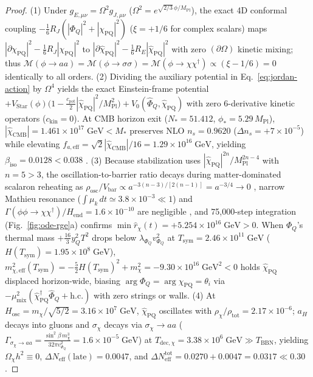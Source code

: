 \documentclass[11pt,a4paper]{article}
\begin{document}
\begin{proof}
(1) Under $g_{E,\mu\nu} = \Omega^2 g_{J,\mu\nu}$ ($\Omega^2 = e^{\sqrt{2/3}\,\phi/M_{\mathrm{Pl}}}$), the exact 4D conformal coupling $-\frac{1}{6}R_J(|\Phi_Q|^2 + |\chi_{\mathrm{PQ}}|^2)$ ($\xi = +1/6$ for complex scalars) maps $|\partial\chi_{\mathrm{PQ}}|^2 - \frac{1}{6}R_J|\chi_{\mathrm{PQ}}|^2$ to $|\partial\hat{\chi}_{\mathrm{PQ}}|^2 - \frac{1}{6}R_E|\hat{\chi}_{\mathrm{PQ}}|^2$ with zero $(\partial\Omega)$ kinetic mixing; thus $\mathcal{M}(\phi \to aa) = \mathcal{M}(\phi \to \sigma\sigma) = \mathcal{M}(\phi \to \chi\chi^\dagger) \propto (\xi - 1/6) = 0$ identically to all orders.
(2) Dividing the auxiliary potential in Eq.~\eqref{eq:jordan-action} by $\Omega^4$ yields the exact Einstein-frame potential $+V_{\mathrm{Star}}(\phi)\big(1 - \frac{c_{\mathrm{pot}}}{2}|\hat{\chi}_{\mathrm{PQ}}|^2/M_{\mathrm{Pl}}^2\big) + V_0(\hat{\Phi}_Q,\hat{\chi}_{\mathrm{PQ}})$ with zero 6-derivative kinetic operators ($c_{\mathrm{kin}} = 0$). At CMB horizon exit ($N_* = 51.412$, $\phi_* = 5.29\,M_{\mathrm{Pl}}$), $|\hat{\chi}_{\mathrm{CMB}}| = 1.461\times 10^{17}\;\mathrm{GeV} < M_*$ preserves NLO $n_s = 0.9620$ ($\Delta n_s = +7\times 10^{-5}$) while elevating $f_{a,\mathrm{eff}} = \sqrt{2}|\hat{\chi}_{\mathrm{CMB}}|/16 = 1.29\times 10^{16}\;\mathrm{GeV}$, yielding $\beta_{\mathrm{iso}} = 0.0128 < 0.038$ \cite{Linde1991Axion,HarigayaIbeKawasakiYanagida2015}.
(3) Because stabilization uses $|\hat{\chi}_{\mathrm{PQ}}|^{2n}/M_{\mathrm{Pl}}^{2n-4}$ with $n = 5 > 3$, the oscillation-to-barrier ratio decays during matter-dominated scalaron reheating as $\rho_{\mathrm{osc}}/V_{\mathrm{bar}} \propto a^{-3(n-3)/[2(n-1)]} = a^{-3/4} \to 0$ \cite{HarigayaIbeKawasakiYanagida2015}, narrow Mathieu resonance ($\int\mu_k\,dt \simeq 3.8\times 10^{-3} \ll 1$) and $\Gamma(\phi\phi\to\chi\chi^\dagger)/H_{\mathrm{end}} = 1.6\times 10^{-10}$ are negligible \cite{KasuyaKawasakiYanagida1997}, and 75,000-step integration (Fig.~\ref{fig:ode-rge}a) confirms $\min \hat{r}_\chi(t) = +5.254\times 10^{16}\;\mathrm{GeV} > 0$. When $\Phi_Q$'s thermal mass $+\frac{16}{3}y_Q^2 T^2$ drops below $\lambda_{\Phi_Q}v_{\Phi_Q}^2$ at $T_{\mathrm{sym}} = 2.46\times 10^{11}\;\mathrm{GeV}$ ($H(T_{\mathrm{sym}}) = 1.95\times 10^8\;\mathrm{GeV}$), $m_{\chi,\mathrm{eff}}^2(T_{\mathrm{sym}}) = -\frac{5}{2}H(T_{\mathrm{sym}})^2 + m_\chi^2 = -9.30\times 10^{16}\;\mathrm{GeV}^2 < 0$ holds $\hat{\chi}_{\mathrm{PQ}}$ displaced horizon-wide, biasing $\arg\Phi_Q = \arg\chi_{\mathrm{PQ}} = \theta_i$ via $-\mu_{\mathrm{mix}}^2(\hat{\chi}_{\mathrm{PQ}}^\dagger\hat{\Phi}_Q + \mathrm{h.c.})$ with zero strings or walls.
(4) At $H_{\mathrm{osc}} = m_\chi/\sqrt{5/2} = 3.16\times 10^7\;\mathrm{GeV}$, $\hat{\chi}_{\mathrm{PQ}}$ oscillates with $\rho_\chi/\rho_{\mathrm{tot}} = 2.17\times 10^{-6}$; $a_H$ decays into gluons and $\sigma_\chi$ decays via $\sigma_\chi \to aa$ ($\Gamma_{\sigma_\chi\to aa} = \frac{\sin^2\beta\,m_\chi^3}{32\pi v_{\Phi_Q}^2} = 1.6\times 10^{-5}\;\mathrm{GeV}$) at $T_{\mathrm{dec},\chi} = 3.38\times 10^6\;\mathrm{GeV} \gg T_{\mathrm{BBN}}$, yielding $\Omega_\chi h^2 \equiv 0$, $\Delta N_{\mathrm{eff}}(\text{late}) = 0.0047$, and $\Delta N_{\mathrm{eff}}^{\mathrm{tot}} = 0.0270 + 0.0047 = 0.0317 \ll 0.30$. \qedhere
\end{proof}
\end{document}
